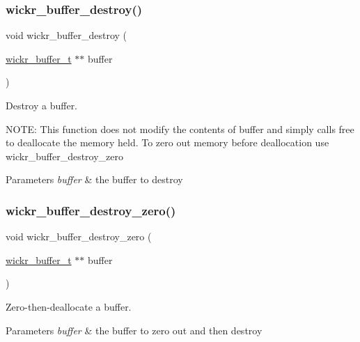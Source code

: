 \subsubsection{\texorpdfstring{wickr\+\_\+buffer\+\_\+destroy()}{wickr\_buffer\_destroy()}}
{\footnotesize\ttfamily void wickr\+\_\+buffer\+\_\+destroy (\begin{DoxyParamCaption}\item[{\mbox{\hyperlink{structwickr__buffer}{wickr\+\_\+buffer\+\_\+t}} $\ast$$\ast$}]{buffer }\end{DoxyParamCaption})}



Destroy a buffer. 

N\+O\+TE\+: This function does not modify the contents of buffer and simply calls free to deallocate the memory held. To zero out memory before deallocation use \textquotesingle{}wickr\+\_\+buffer\+\_\+destroy\+\_\+zero\textquotesingle{}


\begin{DoxyParams}{Parameters}
{\em buffer} & the buffer to destroy \\
\hline
\end{DoxyParams}
\mbox{\label{group__wickr__buffer_gaf0ff6486debbfd676b7675f6f899fc40}} 
\subsubsection{\texorpdfstring{wickr\+\_\+buffer\+\_\+destroy\+\_\+zero()}{wickr\_buffer\_destroy\_zero()}}
{\footnotesize\ttfamily void wickr\+\_\+buffer\+\_\+destroy\+\_\+zero (\begin{DoxyParamCaption}\item[{\mbox{\hyperlink{structwickr__buffer}{wickr\+\_\+buffer\+\_\+t}} $\ast$$\ast$}]{buffer }\end{DoxyParamCaption})}



Zero-\/then-\/deallocate a buffer. 


\begin{DoxyParams}{Parameters}
{\em buffer} & the buffer to zero out and then destroy \\
\hline
\end{DoxyParams}
\mbox{\label{group__wickr__buffer_ga51ec58848ab0b07d164c6f7d73200c24}} 
